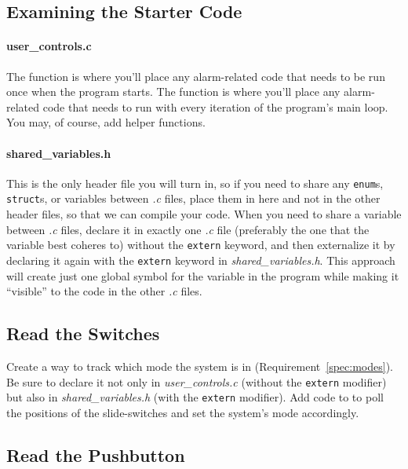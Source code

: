 \subsection{Examining the Starter Code}

\paragraph{user\_controls.c}
The  function is where you'll place any alarm-related code that needs to be run once when the program starts.
The  function is where you'll place any alarm-related code that needs to run with every iteration of the program's main loop.
You may, of course, add helper functions.

\paragraph{shared\_variables.h}
This is the only header file you will turn in, so if you need to share any \lstinline{enum}s, \lstinline{struct}s, or variables between \textit{.c} files, place them in here and not in the other header files, so that we can compile your code.
When you need to share a variable between \textit{.c} files, declare it in exactly one \textit{.c} file (preferably the one that the variable best coheres to) without the \lstinline{extern} keyword,
and then externalize it by declaring it again with the \lstinline{extern} keyword in \textit{shared\_variables.h}.
This approach will create just one global symbol for the variable in the program while making it ``visible'' to the code in the other \textit{.c} files.

\subsection{Read the Switches}

Create a way to track which mode the system is in (Requirement~\ref{spec:modes}).
Be sure to declare it not only in \textit{user\_controls.c} (without the \lstinline{extern} modifier) but also in \textit{shared\_variables.h} (with the \lstinline{extern} modifier).
Add code to  to poll the positions of the slide-switches and set the system's mode accordingly.

\subsection{Read the Pushbutton} \label{subsec:readPushbutton}

